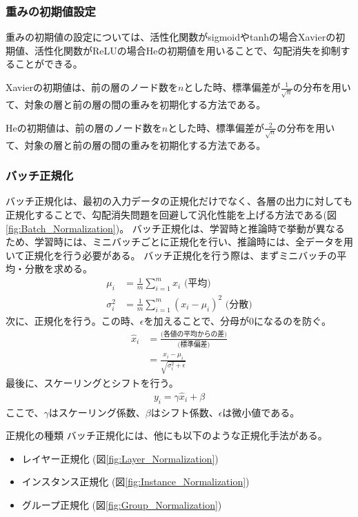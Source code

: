 \documentclass{ltjsarticle}
\begin{document}
\subsubsection{重みの初期値設定}
重みの初期値の設定については、活性化関数がsigmoidやtanhの場合Xavierの初期値、活性化関数がReLUの場合Heの初期値を用いることで、勾配消失を抑制することができる。
\par
Xavierの初期値は、前の層のノード数を$n$とした時、標準偏差が$\frac{1}{\sqrt{n}}$の分布を用いて、対象の層と前の層の間の重みを初期化する方法である。
\par
Heの初期値は、前の層のノード数を$n$とした時、標準偏差が$\frac{2}{\sqrt{n}}$の分布を用いて、対象の層と前の層の間の重みを初期化する方法である。
\subsubsection{バッチ正規化}
バッチ正規化は、最初の入力データの正規化だけでなく、各層の出力に対しても正規化することで、勾配消失問題を回避して汎化性能を上げる方法である(図\ref{fig:Batch_Normalization})。
バッチ正規化は、学習時と推論時で挙動が異なるため、学習時には、ミニバッチごとに正規化を行い、推論時には、全データを用いて正規化を行う必要がある。
バッチ正規化を行う際は、まずミニバッチの平均・分散を求める。
\begin{align}
  \mu_i &= \frac{1}{m}\sum_{i=1}^{m}x_i \text{  (平均)} \\
  \sigma_i^2 &= \frac{1}{m}\sum_{i=1}^{m}(x_i - \mu_i)^2 \text{  (分散)}
\end{align}
次に、正規化を行う。この時、$\epsilon$を加えることで、分母が0になるのを防ぐ。
\begin{align}
  \hat{x}_i &=\frac{\text{(各値の平均からの差)}}{\text{(標準偏差)}}\\
  &=  \frac{x_i - \mu_i}{\sqrt{\sigma_i^2 + \epsilon}} 
\end{align}
最後に、スケーリングとシフトを行う。
\begin{align} 
  y_i = \gamma \hat{x}_i + \beta
\end{align}
ここで、$\gamma$はスケーリング係数、$\beta$はシフト係数、$\epsilon$は微小値である。

\begin{itembox}[l]{正規化の種類}
  バッチ正規化には、他にも以下のような正規化手法がある。
  \begin{itemize}
    \item レイヤー正規化 (図\ref{fig:Layer_Normalization})
    \item インスタンス正規化 (図\ref{fig:Instance_Normalization})
    \item グループ正規化 (図\ref{fig:Group_Normalization})
  \end{itemize}
\end{itembox}
\end{document}
